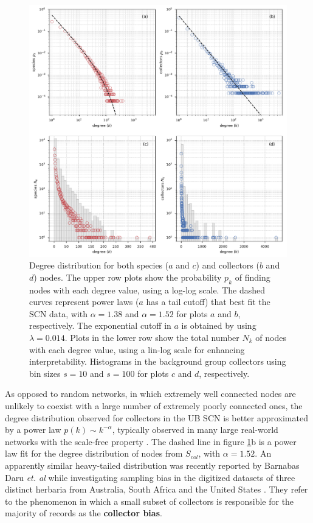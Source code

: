   \begin{figure}[t]
  	\centering
    \includegraphics[width=\linewidth]{figures/casestudy_ub/scn_degree_dist}
    \caption[Degree distribution for both species and collectors nodes.]{Degree distribution for both species ($a$ and $c$) and collectors ($b$ and $d$) nodes. The upper row plots show the probability $p_k$ of finding nodes with each degree value, using a log-log scale. The dashed curves represent power laws ($a$ has a tail cutoff) that best fit the SCN data, with $\alpha=1.38$ and $\alpha=1.52$ for plots $a$ and $b$, respectively. The exponential cutoff in $a$ is obtained by using $\lambda=0.014$. Plots in the lower row show the total number $N_k$ of nodes with each degree value, using a lin-log scale for enhancing interpretability. Histograms in the background group collectors using bin sizes $s=10$ and $s=100$ for plots $c$ and $d$, respectively.}
    \label{fig:ub_scn_degree_dist}
  \end{figure}

As opposed to random networks, in which extremely well connected nodes are unlikely to coexist with a large number of extremely poorly connected ones, the degree distribution observed for collectors in the UB SCN is better approximated by a power law $p(k) \sim k^{-\alpha}$, typically observed in many large real-world networks with the scale-free property \cite{Barabasi1999a}. 
The dashed line in figure \ref{fig:ub_scn_degree_dist}b is a power law fit for the degree distribution of nodes from $S_{col}$, with $\alpha=1.52$. 
An apparently similar heavy-tailed distribution was recently reported by Barnabas Daru \textit{et. al} while investigating sampling bias in the digitized datasets of three distinct herbaria from Australia, South Africa and the United States \cite{Daru2017}.
They refer to the phenomenon in which a small subset of collectors is responsible for the majority of records as the \textbf{collector bias}.
  
